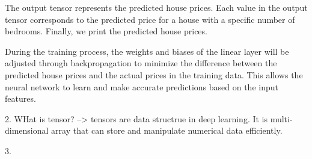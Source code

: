  The output tensor represents the predicted house prices. Each value in the output tensor corresponds to the predicted price for a house with a specific number of bedrooms. Finally, we print the predicted house prices.
 
 During the training process, the weights and biases of the linear layer will be adjusted through backpropagation to minimize the difference between the predicted house prices and the actual prices in the training data. This allows the neural network to learn and make accurate predictions based on the input features.

 
2. WHat is tensor?
 --> tensors are data structrue in deep learning. It is multi-dimensional array that can store and manipulate numerical
 data efficiently.

 3.